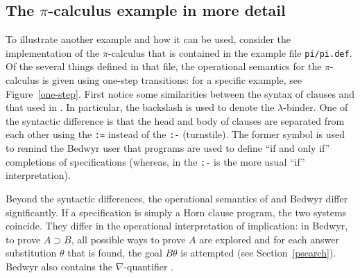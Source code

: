 \subsection{The \texorpdfstring{$\pi$}{pi}-calculus example in more detail}
\label{pi-examples}

To illustrate another example and how it
can be used, consider the implementation of the $\pi$-calculus that is
contained in the example file \verb+pi/pi.def+.  Of the several
things defined in that file, the operational semantics for the
$\pi$-calculus is given using one-step transitions: for a specific
example, see Figure~\ref{one-step}.  First notice some similarities
between the syntax of clauses and that used in \lp{}.  In
particular, the backslash is used to denote the $\lambda$-binder.  One
of the syntactic difference is that the head and body of clauses are
separated from each other using the \verb+:=+ instead of the
\verb+:-+ (turnstile).  The former symbol is used to remind
the Bedwyr user that programs are used to define ``if and only if''
completions of specifications (whereas, in \lp{} the \verb+:-+ is the
more usual ``if'' interpretation).

Beyond the syntactic differences, the operational semantics of \lp{}
and Bedwyr differ significantly.  If a specification is simply a Horn
clause program, the two systems coincide. They differ in the operational
interpretation of implication: in Bedwyr, to prove $A\supset B$, all
possible ways to prove $A$ are explored and
for each answer substitution $\theta$ that is found, the goal
$B\theta$ is attempted (see Section~\ref{psearch}).  Bedwyr also
contains the $\nabla$-quantifier \cite{miller05tocl}.

